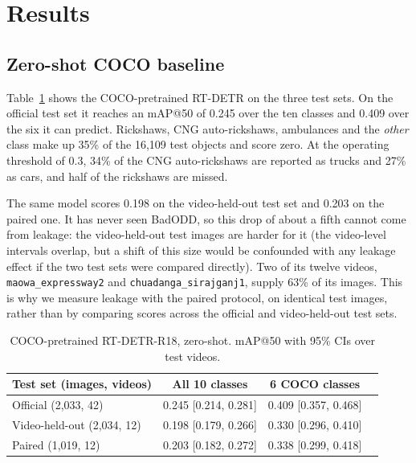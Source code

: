 \documentclass[conference]{IEEEtran}
\newcommand{\vid}[1]{\texttt{#1}}            %
\begin{document}
\section{Results}

\subsection{Zero-shot COCO baseline}
\label{sec:zeroshot}
Table~\ref{tab:zeroshot} shows the COCO-pretrained RT-DETR on the three test sets. On the official test
set it reaches an mAP@50 of 0.245 over the ten classes and 0.409 over the six it can predict. Rickshaws,
CNG auto-rickshaws, ambulances and the \emph{other} class make up 35\% of the 16,109 test objects and score
zero. At the operating threshold of 0.3, 34\% of the CNG auto-rickshaws are reported as trucks and 27\% as
cars, and half of the rickshaws are missed.

The same model scores 0.198 on the video-held-out test set and 0.203 on the paired one. It has never seen
BadODD, so this drop of about a fifth cannot come from leakage: the video-held-out test images are harder
for it (the video-level intervals overlap, but a shift of this size would be confounded with any leakage
effect if the two test sets were compared directly). Two of its twelve
videos, \vid{maowa\_expressway2} and \vid{chuadanga\_sirajganj1}, supply 63\% of its images. This is why we measure leakage with the paired protocol, on identical test
images, rather than by comparing scores across the official and video-held-out test sets.

\begin{table}[t]
\centering
\caption{COCO-pretrained RT-DETR-R18, zero-shot. mAP@50 with 95\% CIs over test videos.}
\label{tab:zeroshot}
\setlength{\tabcolsep}{3.5pt}
\begin{tabular}{@{}lccc@{}}
\toprule
Test set (images, videos) & All 10 classes & 6 COCO classes \\
\midrule
Official (2,033, 42)       & 0.245 [0.214, 0.281] & 0.409 [0.357, 0.468] \\
Video-held-out (2,034, 12) & 0.198 [0.179, 0.266] & 0.330 [0.296, 0.410] \\
Paired (1,019, 12)         & 0.203 [0.182, 0.272] & 0.338 [0.299, 0.418] \\
\bottomrule
\end{tabular}
\end{table}
\end{document}
